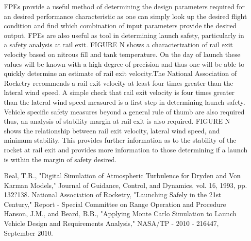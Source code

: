 \documentclass[10pt,a4paper]{article}
\begin{document}
FPEs provide a useful method of determining the design parameters required for an desired performance characteristic as one can simply look up the desired flight condition and find which combination of input parameters provide the desired output. FPEs are also useful as tool in determining launch safety, particularly in a safety analysis at rail exit. FIGURE N shows a characterization of rail exit velocity based on nitrous fill and tank temperature. On the day of launch these values will be known with a high degree of precision and thus one will be able to quickly determine an estimate of rail exit velocity.The National Association of Rocketry recommends a rail exit velocity at least four times greater than the lateral wind speed\cite{nar}. A simple check that rail exit velocity is four times greater than the lateral wind speed measured is a first step in determining launch safety. Vehicle specific safety measures beyond a general rule of thumb are also required thus, an analysis of stability margin at rail exit is also required. FIGURE N shows the relationship between rail exit velocity, lateral wind speed, and minimum stability. This provides further information as to the stability of the rocket at rail exit and provides more information to those determining if a launch is within the margin of safety desired. 
\begin{thebibliography}{10}
	Beal, T.R., 
	"Digital Simulation of Atmospheric Turbulence for Dryden and Von Karman Models,"
	Journal of Guidance, Control, and Dynamics, vol. 16, 1993, pp. 132?138.
	National Association of Rocketry,
	"Launching Safely in the 21st Century,"
	Report - Special Committee on Range Operation and Procedure
	Hanson, J.M., and Beard, B.B.,
	"Applying Monte Carlo Simulation to Launch Vehicle Design and Requirements Analysis,"
	NASA/TP - 2010 - 216447, September 2010.
\end{thebibliography}
\end{document}
